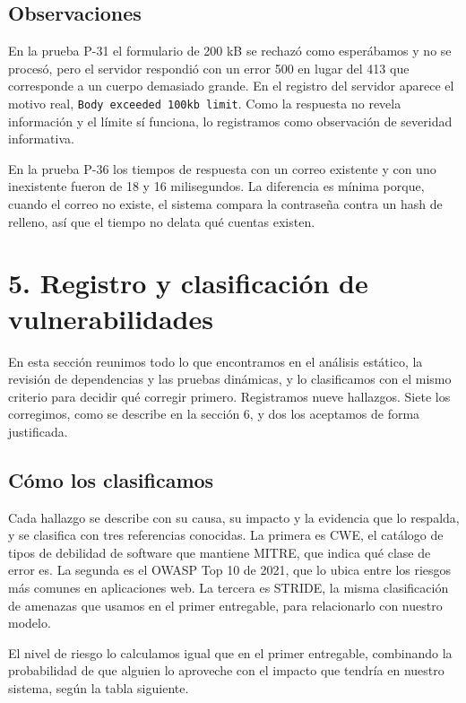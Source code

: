 \documentclass[12pt, letterpaper]{article}
\begin{document}
\subsection{Observaciones}

En la prueba P-31 el formulario de 200 kB se rechazó como esperábamos y no se procesó, pero el servidor respondió con un error 500 en lugar del 413 que corresponde a un cuerpo demasiado grande. En el registro del servidor aparece el motivo real, \texttt{Body exceeded 100kb limit}. Como la respuesta no revela información y el límite sí funciona, lo registramos como observación de severidad informativa.

En la prueba P-36 los tiempos de respuesta con un correo existente y con uno inexistente fueron de 18 y 16 milisegundos. La diferencia es mínima porque, cuando el correo no existe, el sistema compara la contraseña contra un hash de relleno, así que el tiempo no delata qué cuentas existen.

\section{5. Registro y clasificación de vulnerabilidades}

En esta sección reunimos todo lo que encontramos en el análisis estático, la revisión de dependencias y las pruebas dinámicas, y lo clasificamos con el mismo criterio para decidir qué corregir primero. Registramos nueve hallazgos. Siete los corregimos, como se describe en la sección 6, y dos los aceptamos de forma justificada.

\subsection{Cómo los clasificamos}

Cada hallazgo se describe con su causa, su impacto y la evidencia que lo respalda, y se clasifica con tres referencias conocidas. La primera es CWE, el catálogo de tipos de debilidad de software que mantiene MITRE, que indica qué clase de error es. La segunda es el OWASP Top 10 de 2021, que lo ubica entre los riesgos más comunes en aplicaciones web. La tercera es STRIDE, la misma clasificación de amenazas que usamos en el primer entregable, para relacionarlo con nuestro modelo.

El nivel de riesgo lo calculamos igual que en el primer entregable, combinando la probabilidad de que alguien lo aproveche con el impacto que tendría en nuestro sistema, según la tabla siguiente.
\end{document}
